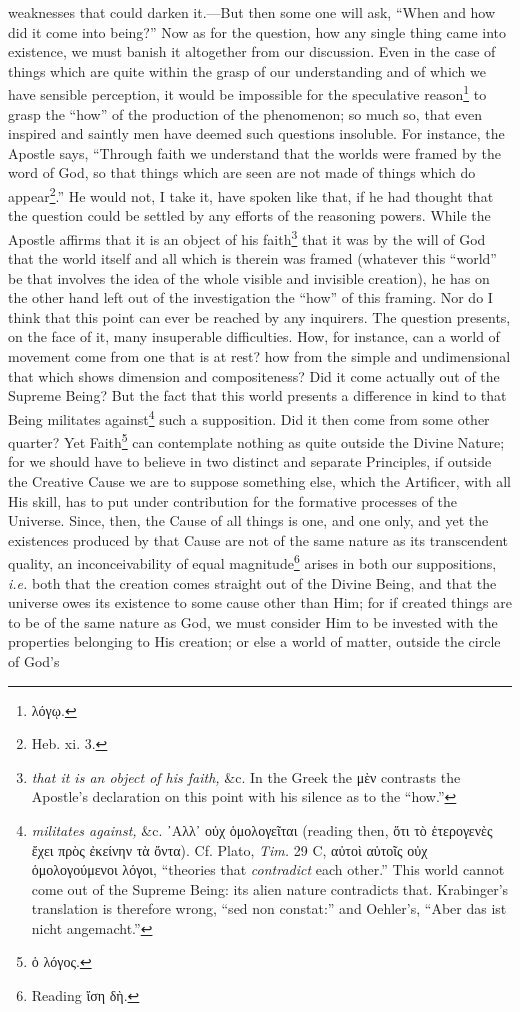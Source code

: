 weaknesses that could darken it.—But then some one will ask, “When and how did it come into being?” Now as for the question, how any single thing came into existence, we must banish it altogether from our discussion. Even in the case of things which are quite within the grasp of our understanding and of which we have sensible perception, it would be impossible for the speculative reason\footnote{\textgreek{λόγῳ}.} to grasp the “how” of the production of the phenomenon; so much so, that even inspired and saintly men have deemed such questions insoluble. For instance, the Apostle says, “Through faith we understand that the worlds were framed by the word of God, so that things which are seen are not made of things which do appear\footnote{Heb. xi. 3.}.” He would not, I take it, have spoken like that, if he had thought that the question could be settled by any efforts of the reasoning powers. While the Apostle affirms that it is an object of his faith\footnote{\emph{that it is an object of his faith,} \&c. In the Greek the \textgreek{μὲν} contrasts the Apostle’s declaration on this point with his silence as to the “how.”} that it was by the will of God that the world itself and all which is therein was framed (whatever this “world” be that involves the idea of the whole visible and invisible creation), he has on the other hand left out of the investigation the “how” of this framing. Nor do I think that this point can ever be reached by any inquirers. The question presents, on the face of it, many insuperable difficulties. How, for instance, can a world of movement come from one that is at rest? how from the simple and undimensional that which shows dimension and compositeness? Did it come actually out of the Supreme Being? But the fact that this world presents a difference in kind to that Being militates against\footnote{\emph{militates against,} \&c. \textgreek{᾽Αλλ᾽ οὐχ ὁμολογεῖται} (reading then, \textgreek{ὅτι τὸ ἑτερογενὲς ἔχει πρὸς ἐκείνην τὰ ὄντα}). Cf. Plato, \emph{Tim.} 29 C, \textgreek{αὐτοὶ αὑτοῖς οὐχ ὁμολογούμενοι λόγοι}, “theories that \emph{contradict} each other.” This world cannot come out of the Supreme Being: its alien nature contradicts that. Krabinger’s translation is therefore wrong, “sed non constat:” and Oehler’s, “Aber das ist nicht angemacht.”} such a supposition. Did it then come from some other quarter? Yet Faith\footnote{\textgreek{ὁ λόγος}.} can contemplate nothing as quite outside the Divine Nature; for we should have to believe in two distinct and separate Principles, if outside the Creative Cause we are to suppose something else, which the Artificer, with all His skill, has to put under contribution for the formative processes of the Universe. Since, then, the Cause of all things is one, and one only, and yet the existences produced by that Cause are not of the same nature as its transcendent quality, an inconceivability of equal magnitude\footnote{Reading \textgreek{ἴση δὴ}.} arises in both our suppositions, \emph{i.e.} both that the creation comes straight out of the Divine Being, and that the universe owes its existence to some cause other than Him; for if created things are to be of the same nature as God, we must consider Him to be invested with the properties belonging to His creation; or else a world of matter, outside the circle of God’s 